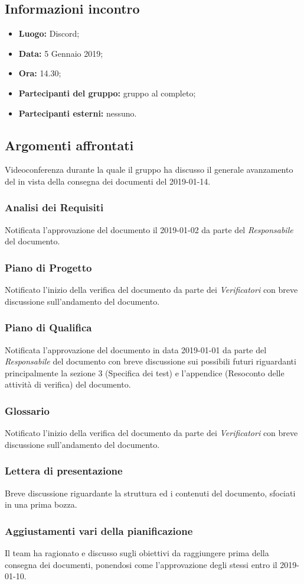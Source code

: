 \subsection{Informazioni incontro}
\begin{itemize}
	\item { \textbf{Luogo:} Discord;  }
	\item { \textbf{Data:} 5 Gennaio 2019; }
	\item { \textbf{Ora:} 14.30; }
	\item { \textbf{Partecipanti del gruppo:} gruppo al completo;}
	\item { \textbf{Partecipanti esterni:} nessuno. }
\end{itemize}


\subsection{Argomenti affrontati}
Videoconferenza durante la quale il gruppo ha discusso il generale avanzamento del  in vista della consegna dei documenti del 2019-01-14.

\subsubsection{Analisi dei Requisiti}
Notificata l'approvazione del documento il 2019-01-02 da parte del \emph{Responsabile} del documento.
\subsubsection{Piano di Progetto}
Notificato l'inizio della verifica del documento da parte dei \emph{Verificatori} con breve discussione sull'andamento del documento.
\subsubsection{Piano di Qualifica}
Notificata l'approvazione del documento in data 2019-01-01 da parte del \emph{Responsabile} del documento con breve discussione sui possibili  futuri riguardanti principalmente la sezione 3 (Specifica dei test) e l'appendice (Resoconto delle attività di verifica) del documento.
\subsubsection{Glossario}
Notificato l'inizio della verifica del documento da parte dei \emph{Verificatori} con breve discussione sull'andamento del documento.
\subsubsection{Lettera di presentazione}
Breve discussione riguardante la struttura ed i contenuti del documento, sfociati in una prima bozza.
\subsubsection{Aggiustamenti vari della pianificazione}
Il team ha ragionato e discusso sugli obiettivi da raggiungere prima della consegna dei documenti, ponendosi come  l'approvazione degli stessi entro il 2019-01-10. 
